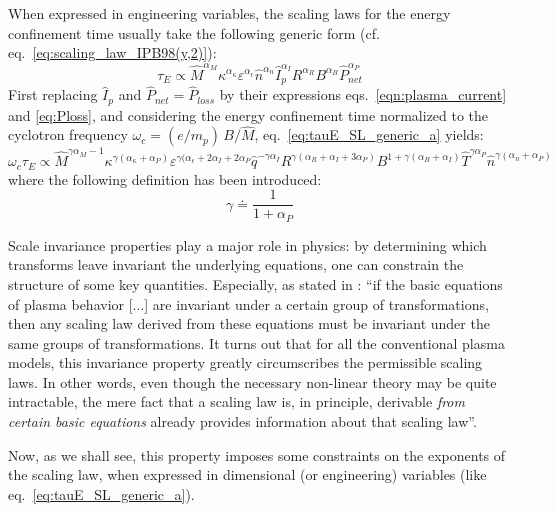 When expressed in engineering variables, the scaling laws for the energy confinement time usually take the following generic form (cf. eq.~\eqref{eq:scaling_law_IPB98(y,2)}):
\begin{equation}
  \label{eq:tauE_SL_generic_a}
  \tau_E \propto \hat M^{\alpha_M} \kappa^{\alpha_\kappa} \varepsilon^{\alpha_\epsilon} \hat n^{\alpha_n} \hat I_p^{\alpha_I} R^{\alpha_R} B^{\alpha_B} \hat P_{net}^{\alpha_P}
\end{equation}
First replacing $\hat I_p$ and $\hat P_{net} = \hat P_{loss}$ by their expressions eqs.~\eqref{eqn:plasma_current} and \eqref{eq:Ploss}, and considering the energy confinement time normalized to the cyclotron frequency $\omega_c = (e/m_p)\, B/\hat M$, eq.~\eqref{eq:tauE_SL_generic_a} yields:
\begin{equation}
\label{eq:tauE_SL_generic_b}
  \omega_c \tau_E \propto 
  \hat M^{\gamma\alpha_M - 1} 
  \kappa^{\gamma(\alpha_\kappa+\alpha_P)} 
  \varepsilon^{\gamma(\alpha_\epsilon+2\alpha_I+2\alpha_P} 
  \hat q^{-\gamma\alpha_I} 
  R^{\gamma(\alpha_R+\alpha_I+3\alpha_P)} 
  B^{1 + \gamma(\alpha_B+\alpha_I)} 
  \hat T^{\gamma\alpha_P}
  \hat n^{\gamma(\alpha_n+\alpha_P)} 
\end{equation}
where the following definition has been introduced:
$$ 
  \gamma \doteq \frac{1}{1+\alpha_P}
$$

Scale invariance properties play a major role in physics: by determining which transforms leave invariant the underlying equations, one can constrain the structure of some key quantities. Especially, as stated in \cite{Connor1977}: ``if the basic equations of plasma behavior [...] are invariant under a certain group of transformations, then any scaling law derived from these equations must be invariant under the same groups of transformations. It turns out that for all the conventional plasma models, this invariance property greatly circumscribes the permissible scaling laws. In other words, even though the necessary non-linear theory may be quite intractable, the mere fact that a scaling law is, in principle, derivable \emph{from certain basic equations} already provides information about that scaling law''.

Now, as we shall see, this property imposes some constraints on the exponents of the scaling law, when expressed in dimensional (or engineering) variables (like eq.~\ref{eq:tauE_SL_generic_a}). \\

